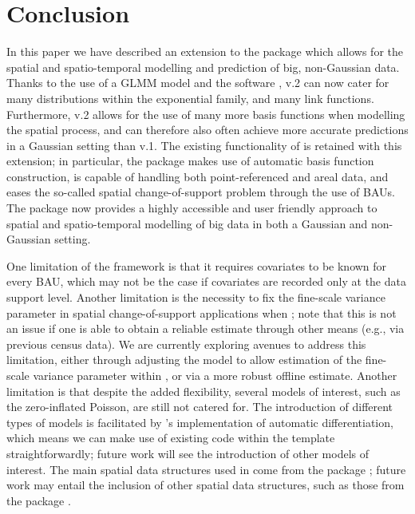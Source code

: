 \documentclass[article]{jss}
\begin{document}
\section{Conclusion}
\label{SEC:Conclusion}


In this paper we have described an extension to the  package  which allows for the spatial and spatio-temporal modelling and prediction of big, non-Gaussian data. 
Thanks to the use of a GLMM model and the software ,  v.2 can now cater for many distributions within the exponential family, and many link functions. 
Furthermore,  v.2 allows for the use of many more basis functions when modelling the spatial process, and can therefore also often achieve more accurate predictions in a Gaussian setting than  v.1. 
The existing functionality of  is retained with this extension; in particular, the package makes use of automatic basis function construction, is capable of handling both point-referenced and areal data, and eases the so-called spatial change-of-support problem through the use of BAUs.
The package now provides a highly accessible and user friendly approach to spatial and spatio-temporal modelling of big data in both a Gaussian and non-Gaussian setting.


One limitation of the framework is that it requires covariates to be known for every BAU, which may not be the case if covariates are recorded only at the data support level.
 Another limitation is the necessity to fix the fine-scale variance parameter in spatial change-of-support applications when ; note that this is not an issue if one is able to obtain a reliable estimate through other means (e.g., via previous census data). 
 We are currently exploring avenues to address this limitation, either through adjusting the model to allow estimation of the fine-scale variance parameter within , or via a more robust offline estimate.
Another limitation is that despite the added flexibility, several models of interest, such as the zero-inflated Poisson, are still not catered for. 
 The introduction of different types of models is facilitated by 's implementation of automatic differentiation, which means we can make use of existing code within the  template straightforwardly; future work will see the introduction of other models of interest.   
 The main spatial data structures used in  come from the package  \citep{Pebesma_2005_sp_package}; future work may entail the inclusion of other spatial data structures, such as those from the package  \citep{Pebesma_2018_sf_package}.
\end{document}
